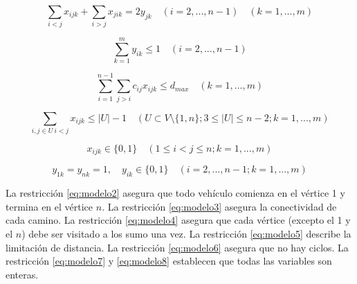 \begin{equation} \label{eq:modelo3}
\sum_{i<j} x_{ijk} + \sum_{i>j} x_{jik} = 2y_{jk} \quad (i =2,...,n-1) \quad (k = 1,...,m)
\end{equation}

\begin{equation} \label{eq:modelo4}
\sum_{k=1}^{m} y_{ik} \leq 1 \quad (i =2,...,n-1)
\end{equation}

\begin{equation} \label{eq:modelo5}
\sum_{i=1}^{n-1} \sum_{j>i} c_{ij}x_{ijk} \leq d_{max} \quad (k=1,...,m)
\end{equation}

\begin{equation} \label{eq:modelo6}
\sum_{i,j\in U \ i<j} x_{ijk} \leq |U|-1 \quad (U \subset V \setminus \{1,n\} ; 3 \leq |U| \leq n-2; k=1,...,m)
\end{equation}

\begin{equation} \label{eq:modelo7}
x_{ijk} \in \{0,1\} \quad (1 \leq i < j \leq n; k=1,...,m)
\end{equation}

\begin{equation} \label{eq:modelo8}
y_{1k} = y_{nk} = 1, \quad y_{ik} \in \{0,1\} \quad (i = 2,...,n-1; k=1,...,m)
\end{equation}

\bigskip

La restricción \ref{eq:modelo2} asegura que todo vehículo comienza en el vértice 1 y termina en el vértice $n$. La restricción \ref{eq:modelo3} asegura la conectividad de cada camino. La restricción \ref{eq:modelo4} asegura que cada vértice (excepto el 1 y el $n$) debe ser visitado a los sumo una vez. La restricción \ref{eq:modelo5} describe la limitación de distancia. La restricción \ref{eq:modelo6} asegura que no hay ciclos. La restricción \ref{eq:modelo7} y \ref{eq:modelo8} establecen que todas las variables son enteras.


